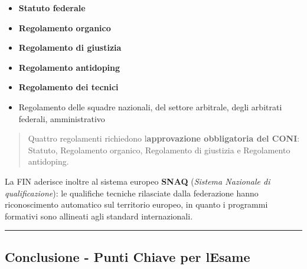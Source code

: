 \documentclass[a4paper,11pt]{article}
\providecommand{\tightlist}{%
  \setlength{\itemsep}{0pt}\setlength{\parskip}{0pt}}
\begin{document}
\begin{itemize}
      \tightlist
      \item
            \textbf{Statuto federale}
      \item
            \textbf{Regolamento organico}
      \item
            \textbf{Regolamento di giustizia}
      \item
            \textbf{Regolamento antidoping}
      \item
            \textbf{Regolamento dei tecnici}
      \item
            Regolamento delle squadre nazionali, del settore arbitrale, degli
            arbitrati federali, amministrativo
\end{itemize}

\begin{quote}
      Quattro regolamenti richiedono l\textquotesingle{}\textbf{approvazione
            obbligatoria del CONI}: Statuto, Regolamento organico, Regolamento di
      giustizia e Regolamento antidoping.
\end{quote}

La FIN aderisce inoltre al sistema europeo \textbf{SNAQ} (\emph{Sistema
      Nazionale di qualificazione}): le qualifiche tecniche rilasciate dalla
federazione hanno riconoscimento automatico sul territorio europeo, in
quanto i programmi formativi sono allineati agli standard
internazionali.

\begin{center}\rule{0.5\linewidth}{0.5pt}\end{center}

\subsection{Conclusione - Punti Chiave per
      l\textquotesingle Esame}\label{conclusione---punti-chiave-per-lesame}
\end{document}
